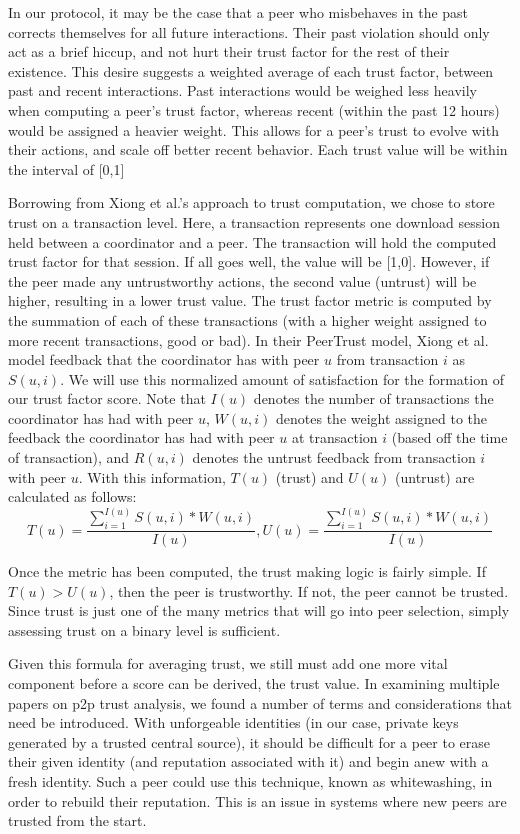 \documentclass[12pt]{article}
\begin{document}
			In our protocol, it may be the case that a peer who misbehaves in the past corrects themselves for all future interactions. Their past violation should only act as a brief hiccup, and not hurt their trust factor for the rest of their existence. This desire suggests a weighted average of each trust factor, between past and recent interactions. Past interactions would be weighed less heavily when computing a peer's trust factor, whereas recent (within the past 12 hours) would be assigned a heavier weight. This allows for a peer's trust to evolve with their actions, and scale off better recent behavior. Each trust value will be within the interval of [0,1]

			Borrowing from Xiong et al.'s approach to trust computation, we chose to store trust on a transaction level. Here, a transaction represents one download session held between a coordinator and a peer. The transaction will hold the computed trust factor for that session. If all goes well, the value will be [1,0]. However, if the peer made any untrustworthy actions, the second value (untrust) will be higher, resulting in a lower trust value. The trust factor metric is computed by the summation of each of these transactions (with a higher weight assigned to more recent transactions, good or bad). In their PeerTrust model, Xiong et al. model feedback that the coordinator has with peer $u$ from transaction $i$ as $S(u,i)$. We will use this normalized amount of satisfaction for the formation of our trust factor score. Note that $I(u)$ denotes the number of transactions the coordinator has had with peer $u$, $W(u,i)$ denotes the weight assigned to the feedback the coordinator has had with peer $u$ at transaction $i$ (based off the time of transaction), and $R(u,i)$ denotes the untrust feedback from transaction $i$ with peer $u$. With this information, $T(u)$ (trust) and $U(u)$ (untrust) are calculated as follows:
			$$
				T(u) = \frac{\sum\limits_{i=1}^{I(u)} S(u,i) * W(u,i)}{I(u)},
				U(u) = \frac{\sum\limits_{i=1}^{I(u)} S(u,i) * W(u,i)}{I(u)}
			$$

			Once the metric has been computed, the trust making logic is fairly simple. If $T(u) > U(u)$, then the peer is trustworthy. If not, the peer cannot be trusted. Since trust is just one of the many metrics that will go into peer selection, simply assessing trust on a binary level is sufficient. 

			Given this formula for averaging trust, we still must add one more vital component before a score can be derived, the trust value. In examining multiple papers on p2p trust analysis, we found a number of terms and considerations that need be introduced. With unforgeable identities (in our case, private keys generated by a trusted central source), it should be difficult for a peer to erase their given identity (and reputation associated with it) and begin anew with a fresh identity. Such a peer could use this technique, known as whitewashing, in order to rebuild their reputation. This is an issue in systems where new peers are trusted from the start.
\end{document}
